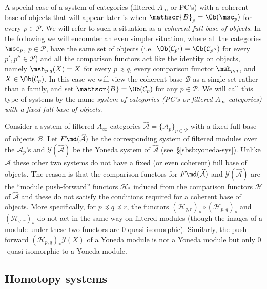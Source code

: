A special case of a system of categories (filtered $A_{\infty}$ or
PC's) with a coherent base of objects that will appear later is when
$\mathscr{B}_p = \Ob(\msc_p)$ for every $p \in \mathcal{P}$. We will
refer to such a situation as a {\em coherent full base of objects}.
In the following we will encounter an even simpler situation, where
all the categories $\msc_p$, $p \in \mathcal{P}$, have the same set of
objects (i.e.~$\Ob(\mathcal{C}_{p'}) = \Ob(\mathcal{C}_{p''})$ for
every $p', p'' \in \mathcal{P}$) and all the comparison functors act
like the identity on objects, namely $\msh_{p,q}(X) = X$ for every
$p \preceq q$, every comparison functor $\msh_{p,q}$, and
$X \in \Ob(\mathcal{C}_{p})$. In this case we will view the coherent
base $\mathscr{B}$ as a single set rather than a family, and set
$\mathscr{B} = \Ob(\mathcal{C}_p)$ for any $p \in \mathcal{P}$.  We
will call this type of systems by the name {\em system of categories
  (PC's or filtered $A_{\infty}$-categories) with a fixed full base of
  objects}.

\begin{rem} \label{r:coh-base} Consider a system of filtered
  $A_{\infty}$-categories
  $\widehat{\mathcal{A}} = \{\mathcal{A}_p\}_{p \in \mathcal{P}}$ with
  a fixed full base of objects $\mathcal{B}$. Let
  $F\md(\widehat{\mathcal{A}})$ be the corresponding system of
  filtered modules over the $\mathcal{A}_p$'s and
  $\mathcal{Y}(\widehat{\mathcal{A}})$ be the Yoneda system of
  $\widehat{\mathcal{A}}$ (see~\S\ref{sbsb:yoneda-sys}). Unlike
  $\widehat{\mathcal{A}}$ these other two systems do not have a fixed
  (or even coherent) full base of objects. The reason is that the
  comparison functors for $F\md(\widehat{\mathcal{A}})$ and
  $\mathcal{Y}(\widehat{\mathcal{A}})$ are the ``module push-forward''
  functors $\mathcal{H}_*$ induced from the comparison functors
  $\mathcal{H}$ of $\widehat{\mathcal{A}}$ and these do not satisfy
  the conditions required for a coherent base of objects. More
  specifically, for $p \preceq q \preceq r$, the functors
  $(\mathcal{H}_{q,r})_* \circ (\mathcal{H}_{p,q})_*$ and
  $(\mathcal{H}_{q,r})_*$ do not act in the same way on filtered
  modules (though the images of a module under these two functors are
  $0$-quasi-isomorphic). Similarly, the push forward
  $(\mathcal{H}_{p,q})_* \mathcal{Y}(X)$ of a Yoneda module is not a
  Yoneda module but only $0$-quasi-isomorphic to a Yoneda module.
\end{rem}


\subsection{Homotopy systems} \label{sbsb:homotopy-sys}

